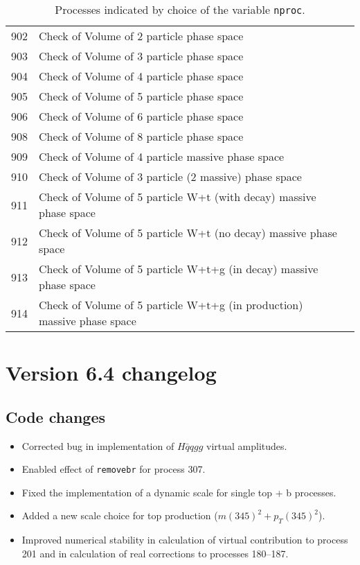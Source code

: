 \documentclass[12pt]{article}
\begin{document}
\begin{table}
\begin{center}
\begin{tabular}{|l|l|l|}
\hline
902 & Check of Volume of 2 particle phase space & \\  
903 & Check of Volume of 3 particle phase space & \\  
904 & Check of Volume of 4 particle phase space & \\  
905 & Check of Volume of 5 particle phase space & \\  
906 & Check of Volume of 6 particle phase space & \\  
908 & Check of Volume of 8 particle phase space & \\  
909 & Check of Volume of 4 particle massive phase space & \\  
910 & Check of Volume of 3 particle (2 massive) phase space & \\  
911 & Check of Volume of 5 particle W+t (with decay) massive phase space & \\  
912 & Check of Volume of 5 particle W+t (no decay) massive phase space & \\  
913 & Check of Volume of 5 particle W+t+g (in decay) massive phase space & \\  
914 & Check of Volume of 5 particle W+t+g (in production) massive phase space & \\  
\hline 
\hline
\end{tabular}
\end{center}
\caption{Processes indicated by choice of the variable {\tt nproc}.\label{nproctable}}
\end{table}
\clearpage

\section{Version 6.4 changelog}
\label{changelog6.4}

\subsection{Code changes}
\begin{itemize}
\item Corrected bug in implementation of $H\bar q q gg$ virtual amplitudes.
\item Enabled effect of {\tt removebr} for process 307.
\item Fixed the implementation of a dynamic scale for single top + b processes.
\item Added a new scale choice for top production ($m(345)^2+p_T(345)^2$).
\item Improved numerical stability in calculation of virtual contribution to process
201 and in calculation of real corrections to processes 180--187.  
\end{itemize}
\end{document}

